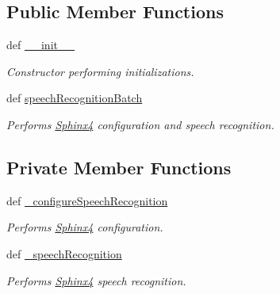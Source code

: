 \subsection*{Public Member Functions}
\begin{DoxyCompactItemize}
\item 
def \hyperlink{classrapp__speech__detection__sphinx4_1_1speech__recognition__sphinx4_1_1SpeechRecognitionSphinx4_a43476824e9fc3fe7671164796b1332eb}{\-\_\-\-\_\-init\-\_\-\-\_\-}
\begin{DoxyCompactList}\small\item\em Constructor performing initializations. \end{DoxyCompactList}\item 
def \hyperlink{classrapp__speech__detection__sphinx4_1_1speech__recognition__sphinx4_1_1SpeechRecognitionSphinx4_a60e2286679d5dce9da486c7b6c3b5ad3}{speech\-Recognition\-Batch}
\begin{DoxyCompactList}\small\item\em Performs \hyperlink{classSphinx4}{Sphinx4} configuration and speech recognition. \end{DoxyCompactList}\end{DoxyCompactItemize}
\subsection*{Private Member Functions}
\begin{DoxyCompactItemize}
\item 
def \hyperlink{classrapp__speech__detection__sphinx4_1_1speech__recognition__sphinx4_1_1SpeechRecognitionSphinx4_a0451d1c7c9a308255d5e93f47b0664f2}{\-\_\-configure\-Speech\-Recognition}
\begin{DoxyCompactList}\small\item\em Performs \hyperlink{classSphinx4}{Sphinx4} configuration. \end{DoxyCompactList}\item 
def \hyperlink{classrapp__speech__detection__sphinx4_1_1speech__recognition__sphinx4_1_1SpeechRecognitionSphinx4_a5256ab73fc56d7db4f6e55b36774fa44}{\-\_\-speech\-Recognition}
\begin{DoxyCompactList}\small\item\em Performs \hyperlink{classSphinx4}{Sphinx4} speech recognition. \end{DoxyCompactList}\end{DoxyCompactItemize}
